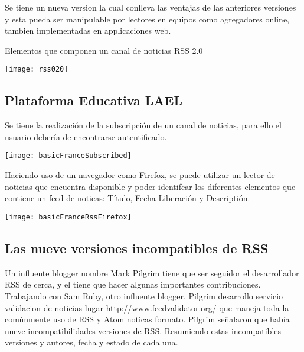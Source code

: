 Se tiene un nueva version la cual conlleva las ventajas de las anteriores versiones y esta pueda ser manipulable por
lectores en equipos como agregadores online, tambien implementadas en applicaciones web.

\begin{center}
	Elementos que componen un canal de noticias RSS 2.0
\end{center}

\begin{minipage}{1.0\linewidth}
	\centering
	\texttt{[image: rss020]}
\end{minipage}

\subsection{Plataforma Educativa LAEL}

Se tiene la realizaci\'{o}n de la subscripci\'{o}n de un canal de noticias, para ello el usuario deber\'{i}a
de encontrarse autentificado. 

\begin{minipage}{1.0\linewidth}
\centering
\texttt{[image: basicFranceSubscribed]}
\end{minipage}

Haciendo uso de un navegador como Firefox, se puede utilizar un lector de noticias que encuentra disponible
y poder identifcar los diferentes elementos que contiene un feed de noticas: T\'{i}tulo, Fecha Liberaci\'{o}n
y Descripti\'{o}n.
 
\begin{minipage}{1.0\linewidth}
\centering
\texttt{[image: basicFranceRssFirefox]}
\end{minipage}


\subsection{Las nueve versiones incompatibles de RSS}

Un influente blogger nombre Mark Pilgrim tiene que ser seguidor el desarrollador RSS de cerca, y el tiene que hacer
algunas importantes contribuciones. Trabajando con Sam Ruby, otro influente blogger, Pilgrim desarrollo servicio validacion de noticias lugar http://www.feedvalidator.org/ que maneja toda la comúnmente uso de RSS y Atom noticas
formato. 
Pilgrim señalaron que había nueve incompatibilidades versiones de RSS. Resumiendo estas incompatibles versiones y
autores, fecha y estado de cada una.\cite{johnson2006rss}

